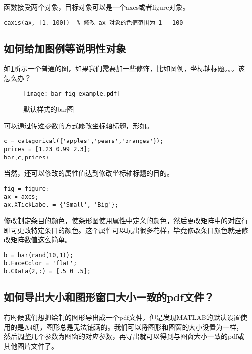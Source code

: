 函数接受两个对象，目标对象可以是一个axes或者figure对象。

\begin{verbatim}
caxis(ax, [1, 100])  % 修改 ax 对象的色值范围为 1 - 100
\end{verbatim}

\subsection{如何给加图例等说明性对象}

如\ref{bar_fig_example}所示一个普通的图，如果我们需要加一些修饰，比如图例，坐标轴标题。。。该怎么办？

\begin{figure}
    \centering
    \texttt{[image: bar\_fig\_example.pdf]}
    \caption{默认样式的bar图}
    \label{bar_fig_example}
\end{figure}

可以通过传递参数的方式修改坐标轴标题，形如。

\begin{verbatim}
c = categorical({'apples','pears','oranges'});
prices = [1.23 0.99 2.3];
bar(c,prices)
\end{verbatim}

当然，还可以修改的属性值达到修改坐标轴标题的目的。

\begin{verbatim}
fig = figure;
ax = axes;
ax.XTickLabel = {'Small', 'Big'};
\end{verbatim}

修改制定条目的颜色，使条形图使用属性中定义的颜色，然后更改矩阵中的对应行即可更改特定条目的颜色。这个属性可以玩出很多花样，毕竟修改条目颜色就是修改矩阵数值这么简单。

\begin{verbatim}
b = bar(rand(10,1));
b.FaceColor = 'flat';
b.CData(2,:) = [.5 0 .5];
\end{verbatim}

\subsection{如何导出大小和图形窗口大小一致的pdf文件？}

有时候我们想把绘制的图形导出成一个pdf文件，但是发现MATLAB的默认设置使用的是A4纸，图形总是无法铺满的。我们可以将图形和图窗的大小设置为一样，然后调整几个参数为图窗的对应参数，再导出就可以得到与图窗大小一致的pdf或其他图片文件了。

